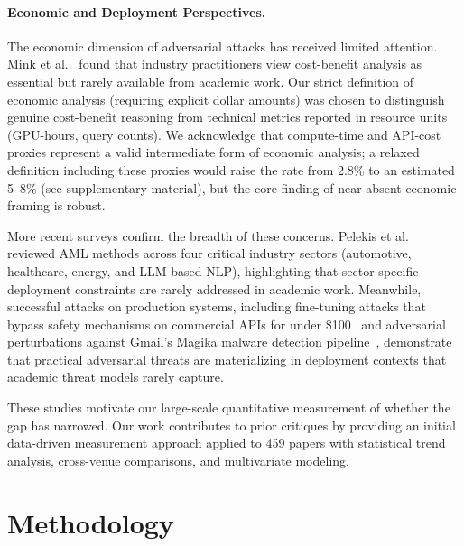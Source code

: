 \documentclass[runningheads]{llncs}
\begin{document}
\paragraph{Economic and Deployment Perspectives.} The economic dimension of adversarial attacks has received limited attention. Mink et al.~\cite{mink2023barriers} found that industry practitioners view cost-benefit analysis as essential but rarely available from academic work. Our strict definition of economic analysis (requiring explicit dollar amounts) was chosen to distinguish genuine cost-benefit reasoning from technical metrics reported in resource units (GPU-hours, query counts). We acknowledge that compute-time and API-cost proxies represent a valid intermediate form of economic analysis; a relaxed definition including these proxies would raise the rate from 2.8\% to an estimated 5--8\% (see supplementary material), but the core finding of near-absent economic framing is robust.

More recent surveys confirm the breadth of these concerns. Pelekis et al.~\cite{pelekis2025adversarial} reviewed AML methods across four critical industry sectors (automotive, healthcare, energy, and LLM-based NLP), highlighting that sector-specific deployment constraints are rarely addressed in academic work. Meanwhile, successful attacks on production systems, including fine-tuning attacks that bypass safety mechanisms on commercial APIs for under \$100~\cite{kazdan2025no} and adversarial perturbations against Gmail's Magika malware detection pipeline~\cite{nasr2025magika}, demonstrate that practical adversarial threats are materializing in deployment contexts that academic threat models rarely capture.

These studies motivate our large-scale quantitative measurement of whether the gap has narrowed. Our work contributes to prior critiques by providing an initial data-driven measurement approach applied to 459 papers with statistical trend analysis, cross-venue comparisons, and multivariate modeling.

\section{Methodology}
\label{sec:methodology}
\end{document}
